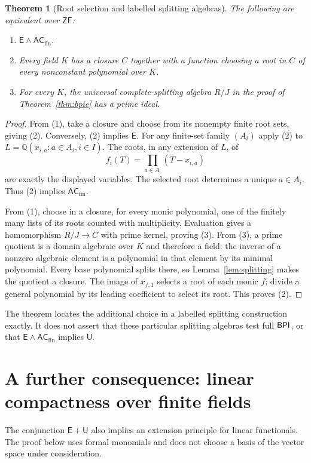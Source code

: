 \documentclass[11pt,a4paper]{article}
\newtheorem{theorem}{Theorem}[section]
\theoremstyle{definition}\newtheorem{definition}[theorem]{Definition}
\theoremstyle{remark}\newtheorem{remark}[theorem]{Remark}
\newcommand{\ZF}{\mathsf{ZF}}\newcommand{\ZFA}{\mathsf{ZFA}}
\newcommand{\E}{\mathsf E}\newcommand{\U}{\mathsf U}
\newcommand{\ACfin}{\mathsf{AC}_{\mathrm{fin}}}
\newcommand{\Q}{\mathbb Q}\newcommand{\F}{\mathbb F}
\begin{document}
\begin{theorem}[Root selection and labelled splitting algebras]\label{thm:rootselect}
The following are equivalent over $\ZF$:
\begin{enumerate}
\item $\E\wedge\ACfin$.
\item Every field $K$ has a closure $C$ together with a function choosing a root in $C$ of every nonconstant polynomial over $K$.
\item For every $K$, the universal complete-splitting algebra $R/J$ in the proof of Theorem~\ref{thm:bpie} has a prime ideal.
\end{enumerate}
\end{theorem}
\begin{proof}
From (1), take a closure and choose from its nonempty finite root sets, giving (2). Conversely, (2) implies $\E$. For any finite-set family $(A_i)$ apply (2) to $L=\Q(x_{i,a}:a\in A_i,i\in I)$. The roots, in any extension of $L$, of
\[
f_i(T)=\prod_{a\in A_i}(T-x_{i,a})
\]
are exactly the displayed variables. The selected root determines a unique $a\in A_i$. Thus (2) implies $\ACfin$.

From (1), choose in a closure, for every monic polynomial, one of the finitely many lists of its roots counted with multiplicity. Evaluation gives a homomorphism $R/J\to C$ with prime kernel, proving (3). From (3), a prime quotient is a domain algebraic over $K$ and therefore a field: the inverse of a nonzero algebraic element is a polynomial in that element by its minimal polynomial. Every base polynomial splits there, so Lemma~\ref{lem:splitting} makes the quotient a closure. The image of $x_{f,1}$ selects a root of each monic $f$; divide a general polynomial by its leading coefficient to select its root. This proves (2).
\end{proof}

The theorem locates the additional choice in a labelled splitting construction exactly. It does not assert that these particular splitting algebras test full $\mathsf{BPI}$, or that $\E\wedge\ACfin$ implies $\U$.

\section{A further consequence: linear compactness over finite fields}

The conjunction $\E+\U$ also implies an extension principle for linear
functionals.  The proof below uses formal monomials and does not choose a
basis of the vector space under consideration.
\end{document}
